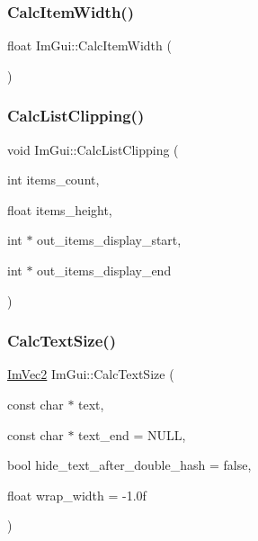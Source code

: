 \mbox{\label{namespace_im_gui_ab3b3ba92ebd8bca4a552dd93321a1994}} 
\subsubsection{\texorpdfstring{Calc\+Item\+Width()}{CalcItemWidth()}}
{\footnotesize\ttfamily float Im\+Gui\+::\+Calc\+Item\+Width (\begin{DoxyParamCaption}{ }\end{DoxyParamCaption})}

\mbox{\label{namespace_im_gui_ae5319370628374ef8febf0c25c285b7e}} 
\subsubsection{\texorpdfstring{Calc\+List\+Clipping()}{CalcListClipping()}}
{\footnotesize\ttfamily void Im\+Gui\+::\+Calc\+List\+Clipping (\begin{DoxyParamCaption}\item[{int}]{items\+\_\+count,  }\item[{float}]{items\+\_\+height,  }\item[{int $\ast$}]{out\+\_\+items\+\_\+display\+\_\+start,  }\item[{int $\ast$}]{out\+\_\+items\+\_\+display\+\_\+end }\end{DoxyParamCaption})}

\mbox{\label{namespace_im_gui_a848b9db6cc4a186751c0ecebcaadc33b}} 
\subsubsection{\texorpdfstring{Calc\+Text\+Size()}{CalcTextSize()}}
{\footnotesize\ttfamily \mbox{\hyperlink{struct_im_vec2}{Im\+Vec2}} Im\+Gui\+::\+Calc\+Text\+Size (\begin{DoxyParamCaption}\item[{const char $\ast$}]{text,  }\item[{const char $\ast$}]{text\+\_\+end = {\ttfamily NULL},  }\item[{bool}]{hide\+\_\+text\+\_\+after\+\_\+double\+\_\+hash = {\ttfamily false},  }\item[{float}]{wrap\+\_\+width = {\ttfamily -\/1.0f} }\end{DoxyParamCaption})}

